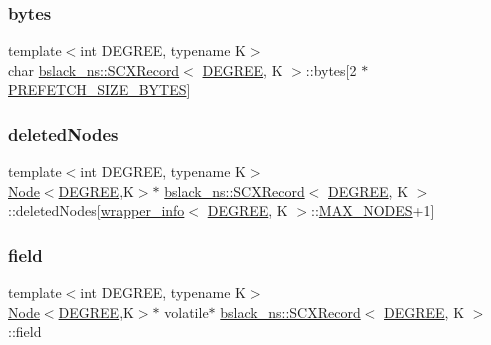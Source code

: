 \subsubsection{\texorpdfstring{bytes}{bytes}}
{\footnotesize\ttfamily template$<$int D\+E\+G\+R\+EE, typename K$>$ \\
char \hyperlink{structbslack__ns_1_1SCXRecord}{bslack\+\_\+ns\+::\+S\+C\+X\+Record}$<$ \hyperlink{brown__sigouin__abtree__kcas_2adapter_8h_a5d88b17d70c985f2f2b8e987037fd6dd}{D\+E\+G\+R\+EE}, K $>$\+::bytes\mbox{[}2 $\ast$\hyperlink{plaf_8h_a9492d3f4847aa8514510373df7ad0e73}{P\+R\+E\+F\+E\+T\+C\+H\+\_\+\+S\+I\+Z\+E\+\_\+\+B\+Y\+T\+ES}\mbox{]}}

\mbox{\label{structbslack__ns_1_1SCXRecord_a1a64afaf954a475278a0400bd8fe45c3}} 
\subsubsection{\texorpdfstring{deleted\+Nodes}{deletedNodes}}
{\footnotesize\ttfamily template$<$int D\+E\+G\+R\+EE, typename K$>$ \\
\hyperlink{structbslack__ns_1_1Node}{Node}$<$\hyperlink{brown__sigouin__abtree__kcas_2adapter_8h_a5d88b17d70c985f2f2b8e987037fd6dd}{D\+E\+G\+R\+EE},K$>$$\ast$ \hyperlink{structbslack__ns_1_1SCXRecord}{bslack\+\_\+ns\+::\+S\+C\+X\+Record}$<$ \hyperlink{brown__sigouin__abtree__kcas_2adapter_8h_a5d88b17d70c985f2f2b8e987037fd6dd}{D\+E\+G\+R\+EE}, K $>$\+::deleted\+Nodes\mbox{[}\hyperlink{classbslack__ns_1_1wrapper__info}{wrapper\+\_\+info}$<$ \hyperlink{brown__sigouin__abtree__kcas_2adapter_8h_a5d88b17d70c985f2f2b8e987037fd6dd}{D\+E\+G\+R\+EE}, K $>$\+::\hyperlink{scxrecord_8h_abd2aacdca9cb2a1a30f3392256b96ea3}{M\+A\+X\+\_\+\+N\+O\+D\+ES}+1\mbox{]}}

\mbox{\label{structbslack__ns_1_1SCXRecord_a04936965dc1749be6b03408ac7207003}} 
\subsubsection{\texorpdfstring{field}{field}}
{\footnotesize\ttfamily template$<$int D\+E\+G\+R\+EE, typename K$>$ \\
\hyperlink{structbslack__ns_1_1Node}{Node}$<$\hyperlink{brown__sigouin__abtree__kcas_2adapter_8h_a5d88b17d70c985f2f2b8e987037fd6dd}{D\+E\+G\+R\+EE},K$>$$\ast$ volatile$\ast$ \hyperlink{structbslack__ns_1_1SCXRecord}{bslack\+\_\+ns\+::\+S\+C\+X\+Record}$<$ \hyperlink{brown__sigouin__abtree__kcas_2adapter_8h_a5d88b17d70c985f2f2b8e987037fd6dd}{D\+E\+G\+R\+EE}, K $>$\+::field}

